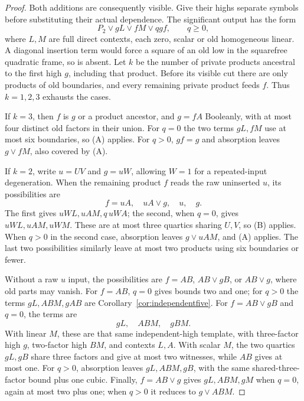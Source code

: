 \documentclass[11pt]{article}
\theoremstyle{definition}
\theoremstyle{remark}
\begin{document}
\begin{proof}
Both additions are consequently visible. Give their highs separate symbols before substituting their actual dependence. The significant output has the form
\[
 P_2\vee gL\vee fM\vee qgf,\qquad q\ge0,
\]
where $L,M$ are full direct contexts, each zero, scalar or old homogeneous linear. A diagonal insertion term would force a square of an old low in the squarefree quadratic frame, so is absent. Let $k$ be the number of private products ancestral to the first high $g$, including that product. Before its visible cut there are only products of old boundaries, and every remaining private product feeds $f$. Thus $k=1,2,3$ exhausts the cases.

If $k=3$, then $f$ is $g$ or a product ancestor, and $g=fA$ Booleanly, with at most four distinct old factors in their union. For $q=0$ the two terms $gL,fM$ use at most six boundaries, so (A) applies. For $q>0$, $gf=g$ and absorption leaves $g\vee fM$, also covered by (A).

If $k=2$, write $u=UV$ and $g=uW$, allowing $W=1$ for a repeated-input degeneration. When the remaining product $f$ reads the raw uninserted $u$, its possibilities are
\[
 f=uA,\quad uA\vee g,\quad u,\quad g.
\]
The first gives $uWL,uAM,q\,uWA$; the second, when $q=0$, gives $uWL,uAM,uWM$. These are at most three quartics sharing $U,V$, so (B) applies. When $q>0$ in the second case, absorption leaves $g\vee uAM$, and (A) applies. The last two possibilities similarly leave at most two products using six boundaries or fewer.

Without a raw $u$ input, the possibilities are $f=AB$, $AB\vee gB$, or $AB\vee g$, where old parts may vanish. For $f=AB$, $q=0$ gives bounds two and one; for $q>0$ the terms $gL,ABM,gAB$ are Corollary~\ref{cor:independentfive}. For $f=AB\vee gB$ and $q=0$, the terms are
\[
 gL,\quad ABM,\quad gBM.
\]
With linear $M$, these are that same independent-high template, with three-factor high $g$, two-factor high $BM$, and contexts $L,A$. With scalar $M$, the two quartics $gL,gB$ share three factors and give at most two witnesses, while $AB$ gives at most one. For $q>0$, absorption leaves $gL,ABM,gB$, with the same shared-three-factor bound plus one cubic. Finally, $f=AB\vee g$ gives $gL,ABM,gM$ when $q=0$, again at most two plus one; when $q>0$ it reduces to $g\vee ABM$.


\end{proof}
\end{document}
